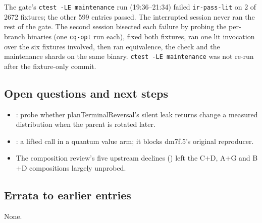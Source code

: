 The gate's \texttt{ctest -LE maintenance} run (19:36--21:34) failed \texttt{ir-pass-lit}
on 2 of 2672 fixtures; the other 599 entries passed. The interrupted session never ran the
rest of the gate. The second session bisected each failure by probing the per-branch
binaries (one \texttt{cq-opt} run each), fixed both fixtures, ran one lit invocation over
the six fixtures involved, then ran equivalence, the  check and the
maintenance shards on the same binary. \texttt{ctest -LE maintenance} was not re-run after
the fixture-only commit.

\subsection*{Open questions and next steps}
\begin{itemize}
  \item {}: probe whether planTerminalReversal's silent leak returns change a
  measured distribution when the parent is rotated later.
  \item {}: a lifted call in a quantum value arm; it blocks dm7f.5's original
  reproducer.
  \item The composition review's five upstream declines () left the C$+$D,
  A$+$G and B$+$D compositions largely unprobed.
\end{itemize}

\subsection*{Errata to earlier entries}
None.
